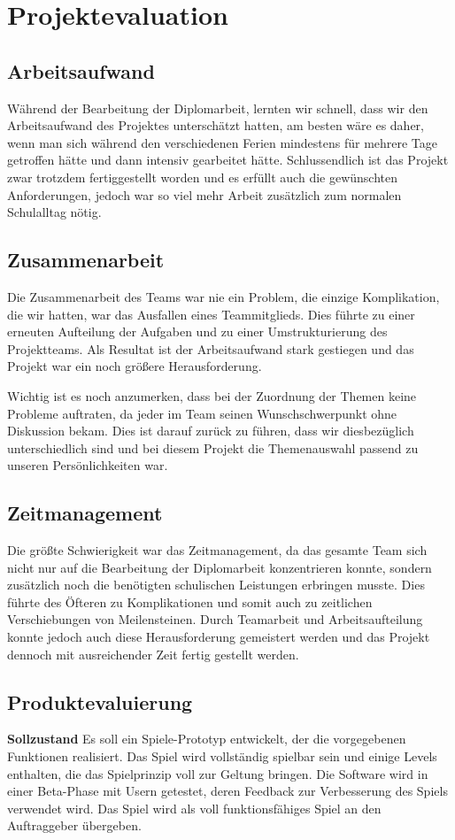 \chapter{Projektevaluation}
\def \currentAuthor {Lukas Vogel}
\section{Arbeitsaufwand}
Während der Bearbeitung der Diplomarbeit, lernten wir schnell, dass wir den Arbeitsaufwand des Projektes unterschätzt hatten, am besten wäre es daher, wenn man sich während den verschiedenen Ferien mindestens für mehrere Tage getroffen hätte und dann intensiv gearbeitet hätte. Schlussendlich ist das Projekt zwar trotzdem fertiggestellt worden und es erfüllt auch die gewünschten Anforderungen, jedoch war so viel mehr Arbeit zusätzlich zum normalen Schulalltag nötig.
\section{Zusammenarbeit}
Die Zusammenarbeit des Teams war nie ein Problem, die einzige Komplikation, die wir hatten, war das Ausfallen eines Teammitglieds. Dies führte zu einer erneuten Aufteilung der Aufgaben und zu einer Umstrukturierung des Projektteams. Als Resultat ist der Arbeitsaufwand stark gestiegen und das Projekt war ein noch größere Herausforderung. 

Wichtig ist es noch anzumerken, dass bei der Zuordnung der Themen  keine Probleme auftraten, da jeder im Team seinen Wunschschwerpunkt ohne Diskussion bekam. Dies ist darauf zurück zu führen, dass wir diesbezüglich unterschiedlich sind und bei diesem Projekt die Themenauswahl passend zu unseren Persönlichkeiten war.

\section{Zeitmanagement}
Die größte Schwierigkeit war das Zeitmanagement, da das gesamte Team sich nicht nur auf die Bearbeitung der Diplomarbeit konzentrieren konnte, sondern zusätzlich noch die benötigten schulischen Leistungen erbringen musste. Dies führte des Öfteren zu Komplikationen und somit auch zu zeitlichen Verschiebungen von Meilensteinen. Durch Teamarbeit und Arbeitsaufteilung konnte jedoch auch diese Herausforderung gemeistert werden und das Projekt dennoch mit ausreichender Zeit fertig gestellt werden.

\section{Produktevaluierung}
\textbf{Sollzustand}\newline
Es soll ein Spiele-Prototyp entwickelt, der die vorgegebenen Funktionen realisiert. Das Spiel wird vollständig spielbar sein und einige Levels enthalten, die das Spielprinzip voll zur Geltung bringen. Die Software wird in einer Beta-Phase mit Usern getestet, deren Feedback zur Verbesserung des Spiels verwendet wird. Das Spiel wird als voll funktionsfähiges Spiel an den Auftraggeber übergeben.

